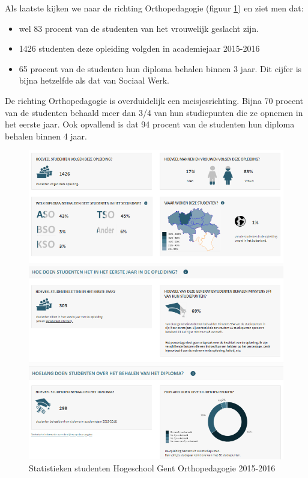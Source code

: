 Als laatste kijken we naar de richting Orthopedagogie (figuur \ref{fig:vlaanderenor}) en ziet men dat:
\begin{itemize}
	\item wel 83 procent van de studenten van het vrouwelijk geslacht zijn.
	\item 1426 studenten deze opleiding volgden in academiejaar 2015-2016
	\item 65 procent van de studenten hun diploma behalen binnen 3 jaar. Dit cijfer is bijna hetzelfde als dat van Sociaal Werk.
\end{itemize}

De richting Orthopedagogie is overduidelijk een meisjesrichting. Bijna 70 procent van de studenten behaald meer dan 3/4 van hun studiepunten die ze opnemen in het eerste jaar. Ook opvallend is dat 94 procent van de studenten hun diploma behalen binnen 4 jaar.

\begin{figure}
	\includegraphics[width=\textwidth]
	{img/vlaanderen_or.png}
	\caption{Statistieken studenten Hogeschool Gent Orthopedagogie 2015-2016
		\autocite{Onderwijs.vlaanderen.be2017}}
	\label{fig:vlaanderenor}
\end{figure}


